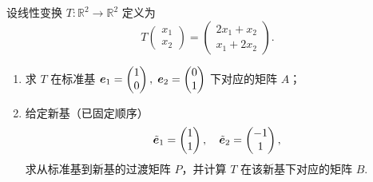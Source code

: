 设线性变换 $T : \mathbb{R}^2 \to \mathbb{R}^2$ 定义为
\[
T\begin{pmatrix} x_1 \\ x_2 \end{pmatrix}
=
\begin{pmatrix}
2x_1 + x_2 \\
x_1 + 2x_2
\end{pmatrix}.
\]
\begin{enumerate}
\item 求 $T$ 在标准基 $\boldsymbol{e}_1 = \begin{pmatrix}1\\0\end{pmatrix},\;
\boldsymbol{e}_2 = \begin{pmatrix}0\\1\end{pmatrix}$ 下对应的矩阵 $A$；
\item 给定新基（已固定顺序）
\[
\tilde{\boldsymbol{e}}_1 = \begin{pmatrix}1\\1\end{pmatrix}, \quad
\tilde{\boldsymbol{e}}_2 = \begin{pmatrix}-1\\1\end{pmatrix},
\]
求从标准基到新基的过渡矩阵 $P$，并计算 $T$ 在该新基下对应的矩阵 $B$.
\end{enumerate}


